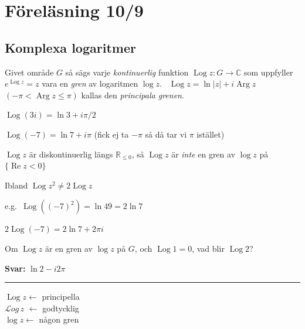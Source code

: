 \section{Föreläsning 10/9}

\subsection{Komplexa logaritmer}
\begin{definition}
Givet område $G$ så sägs varje \emph{kontinuerlig} funktion $\operatorname{Log} z : G \to \mathbb{C}$ som uppfyller $e^{\operatorname{Log} z} = z$ vara en \emph{gren} av logaritmen $\log z$. \ $\operatorname{Log} z = \ln|z| + i\operatorname{Arg} z$ \textcolor{red!70!black}{$(-\pi < \operatorname{Arg} z \le \pi)$} kallas den \emph{principala grenen}.
\end{definition}

\begin{example}
$\operatorname{Log}(3i) = \ln 3 + i\pi/2$

$\operatorname{Log}(-7) = \ln 7 + i\pi$ \quad \textcolor{magenta!80!black}{(fick ej ta $-\pi$ så då tar vi $\pi$ istället)}
\end{example}

\begin{note}
$\operatorname{Log} z$ är diskontinuerlig längs $\mathbb{R}_{\le 0}$, så $\operatorname{Log} z$ är \emph{inte} en gren av $\log z$ på $\{\operatorname{Re} z < 0\}$
\end{note}

\begin{note}
Ibland $\operatorname{Log} z^2 \neq 2\operatorname{Log} z$

e.g.\ $\operatorname{Log}((-7)^2) = \ln 49 = 2\ln 7$

\qquad $2\operatorname{Log}(-7) = 2\ln 7 + 2\pi i$
\end{note}

\begin{example}
Om $\operatorname{Log} z$ är en gren av $\log z$ på $G$, och $\operatorname{Log} 1 = 0$, vad blir $\operatorname{Log} 2$?

\textcolor{red!70!black}{\textbf{Svar:}} $\ln 2 - i2\pi$
\end{example}

\noindent\rule{\linewidth}{0.4pt}

\textcolor{blue!60!black}{
$\operatorname{Log} z \leftarrow$ principella \\
$\mathcal{L}og\, z$ $\leftarrow$ godtycklig \\
$\log z \leftarrow$ någon gren}
